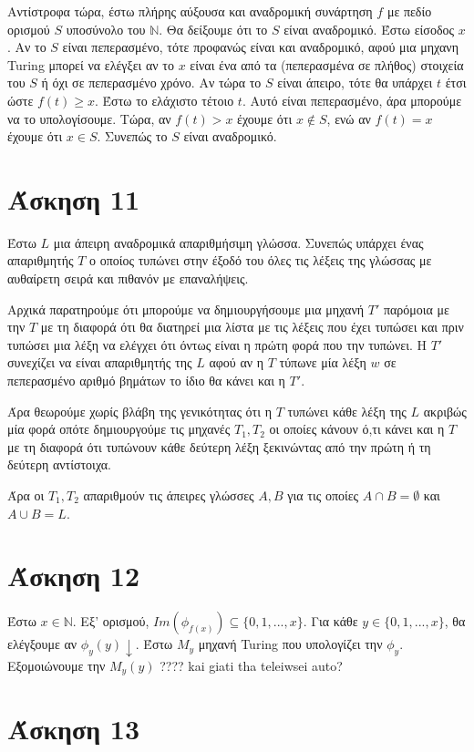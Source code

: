 \documentclass[a4paper, oneside, 11pt]{article}
\theoremstyle{definition}
\begin{document}
Αντίστροφα τώρα, έστω πλήρης αύξουσα και αναδρομική συνάρτηση $f$ με πεδίο ορισμού $S$
υποσύνολο του $\mathbb{N}$. Θα δείξουμε ότι το $S$ είναι αναδρομικό.
Έστω είσοδος $x$. 
Αν το $S$ είναι πεπερασμένο, τότε προφανώς είναι και αναδρομικό, αφού μια μηχανη Turing
μπορεί να ελέγξει αν το $x$ είναι ένα από τα (πεπερασμένα σε πλήθος) στοιχεία του $S$
ή όχι σε πεπερασμένο χρόνο. Αν τώρα το $S$ είναι άπειρο, τότε θα υπάρχει $t$ έτσι
ώστε $f(t) \geq x$. Έστω το ελάχιστο τέτοιο $t$. Αυτό είναι πεπερασμένο, άρα μπορούμε
να το υπολογίσουμε. Τώρα, αν $f(t) > x$ έχουμε ότι $x\notin S$, ενώ αν $f(t) = x$
έχουμε ότι $x\in S$. Συνεπώς το $S$ είναι αναδρομικό.

\section*{Άσκηση 11}

Έστω $L$ μια άπειρη αναδρομικά απαριθμήσιμη γλώσσα. Συνεπώς υπάρχει ένας απαριθμητής
$T$ ο οποίος τυπώνει στην έξοδό του όλες τις λέξεις της γλώσσας με αυθαίρετη σειρά
και πιθανόν με επαναλήψεις.

Αρχικά παρατηρούμε ότι μπορούμε να δημιουργήσουμε μια μηχανή $T'$ παρόμοια με την $T$
με τη διαφορά ότι θα διατηρεί μια λίστα με τις λέξεις που έχει τυπώσει και πριν
τυπώσει μια λέξη να ελέγχει ότι όντως είναι η πρώτη φορά που την τυπώνει. H $T'$
συνεχίζει να είναι απαριθμητής της $L$ αφού αν η $T$ τύπωνε μία λέξη $w$ σε
πεπερασμένο αριθμό βημάτων το ίδιο θα κάνει και η $T'$.

Άρα θεωρούμε χωρίς βλάβη της γενικότητας ότι η $T$ τυπώνει κάθε λέξη της $L$ ακριβώς
μία φορά οπότε δημιουργούμε τις μηχανές $T_1, T_2$ οι οποίες κάνουν ό,τι κάνει και η
$T$ με τη διαφορά ότι τυπώνουν κάθε δεύτερη λέξη ξεκινώντας από την πρώτη ή τη
δεύτερη αντίστοιχα.

Άρα οι $T_1, T_2$ απαριθμούν τις άπειρες γλώσσες $A, B$ για τις οποίες $A \cap B =
\emptyset$ και $A \cup B = L$.

\section*{Άσκηση 12}

Έστω $x\in \mathbb{N}$. Εξ' ορισμού, $Im(\phi_{f(x)})\subseteq \{0,1,...,x\}$. 
Για κάθε $y\in \{0,1,...,x\}$, θα ελέγξουμε αν $\phi_y(y)\downarrow$. Έστω $M_y$
μηχανή Turing που υπολογίζει την $\phi_y$. Εξομοιώνουμε την $M_y(y)$ ???? kai giati tha teleiwsei auto?

\section*{Άσκηση 13}
\end{document}
